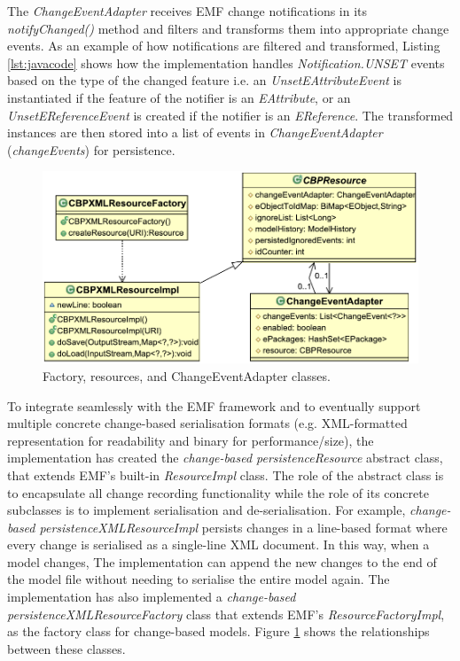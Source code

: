 \documentclass[12pt, a4paper]{report} \usepackage[titletoc]{appendix}
\begin{document}
The \emph{ChangeEventAdapter} receives EMF change notifications in its \emph{notifyChanged()} method and filters and transforms them into appropriate change events. As an example of how notifications are filtered and transformed, Listing \ref{lst:javacode} shows how the implementation handles \emph{Notification.UNSET} events based on the type of the changed feature i.e. an \emph{UnsetEAttributeEvent} is instantiated if the feature of the notifier is an \emph{EAttribute}, or an \emph{UnsetEReferenceEvent} is created if the notifier is an \emph{EReference}. The transformed instances are then stored into a list of events in \emph{ChangeEventAdapter} (\emph{changeEvents}) for persistence. 

\begin{figure}[th]
	\centering
	\includegraphics[width=0.6\linewidth]{resources}
	\caption{Factory, resources, and ChangeEventAdapter classes.}
	\label{fig:resources}
\end{figure}

To integrate seamlessly with the EMF framework and to eventually support multiple concrete change-based serialisation formats (e.g. XML-formatted representation for readability and binary for performance/size), the implementation has created the \emph{change-based persistenceResource} abstract class, that extends EMF's built-in \emph{ResourceImpl} class. The role of the abstract class is to encapsulate all change recording functionality while the role of its concrete subclasses is to implement serialisation and de-serialisation. For example, \emph{change-based persistenceXMLResourceImpl} persists changes in a line-based format where every change is serialised as a single-line XML document. In this way, when a model changes, The implementation can append the new changes to the end of the model file without needing to serialise the entire model again. The implementation has also implemented a \emph{change-based persistenceXMLResourceFactory} class that extends EMF's \emph{ResourceFactoryImpl}, as the factory class for change-based models. Figure \ref{fig:resources} shows the relationships between these classes.
\end{document}
